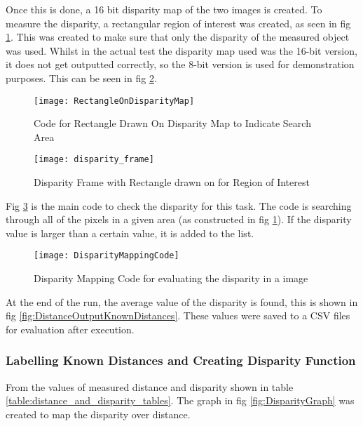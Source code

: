 \documentclass[conference]{IEEEtran}
\begin{document}
Once this is done, a 16 bit disparity map of the two images is created. To measure the disparity, a rectangular region of interest was created, as seen in fig \ref{fig:RectangleOnDisparityMap}. This was created to make sure that only the disparity of the measured object was used. Whilst in the actual test the disparity map used was the 16-bit version, it does not get outputted correctly, so the 8-bit version is used for demonstration purposes. This can be seen in fig \ref{fig:disparity_frame}.

\begin{figure}[H]
\centerline{\texttt{[image: RectangleOnDisparityMap]}}
\caption{Code for Rectangle Drawn On Disparity Map to Indicate Search Area}
\label{fig:RectangleOnDisparityMap}
\end{figure}

\begin{figure}[H]
\centerline{\texttt{[image: disparity\_frame]}}
\caption{Disparity Frame with Rectangle drawn on for Region of Interest}
\label{fig:disparity_frame}
\end{figure}

Fig \ref{fig:DisparityMappingCode} is the main code to check the disparity for this task. The code is searching through all of the pixels in a given area (as constructed in fig \ref{fig:RectangleOnDisparityMap}). If the disparity value is larger than a certain value, it is added to the list. 

\begin{figure}[H]
\centerline{\texttt{[image: DisparityMappingCode]}}
\caption{Disparity Mapping Code for evaluating the disparity in a image}
\label{fig:DisparityMappingCode}
\end{figure}

At the end of the run, the average value of the disparity is found, this is shown in fig \ref{fig:DistanceOutputKnownDistances}. These values were saved to a CSV files for evaluation after execution. 

\subsubsection{Labelling Known Distances and Creating Disparity Function}

From the values of measured distance and disparity shown in table \ref{table:distance_and_disparity_tables}. The graph in fig \ref{fig:DisparityGraph} was created to map the disparity over distance.
\end{document}
